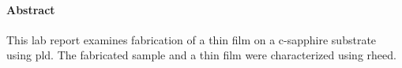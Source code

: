\paragraph{Abstract}
This lab report examines fabrication of a  thin film on a c-sapphire
substrate using \acs*{pld}.
The fabricated  sample and a  thin film were characterized using
\acs*{rheed}.


